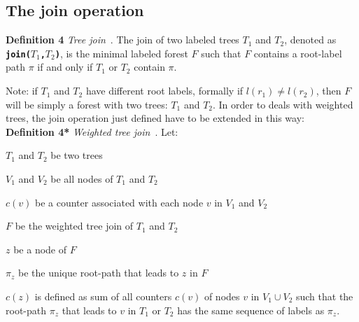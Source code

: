 \documentclass[a4paper,11pt]{report}
\begin{document}
\subsection{The join operation}

\textbf{Definition 4} \emph{Tree join}~\cite{kccf}. 
The join of two labeled trees $T_1$ and $T_2$, denoted as 
\texttt{\textbf{join(}}$T_1$\texttt{\textbf{,}}$T_2$\texttt{\textbf{)}}, 
is the minimal labeled forest $F$ such that $F$ contains a root-label path $\pi$ if and 
only if $T_1$ or $T_2$ contain $\pi$.

Note: if $T_1$ and $T_2$ have different root labels, 
formally if $l(r_1)\ne l(r_2)$, then $F$ will be simply a forest with two trees: $T_1$ and $T_2$. In order to deals with weighted trees, the join operation just defined have to be extended in this way: \\
\textbf{Definition 4*} \emph{Weighted tree join}~\cite{kccf}.
Let: 

\renewcommand{\labelitemi}{$-$}

\begin{itemize*}
\item $T_1$ and $T_2$ be two trees
\item $V_1$ and $V_2$ be all nodes of $T_1$ and $T_2$
\item $c(v)$ be a counter associated with each node $v$ in $V_1$ and $V_2$
\item $F$ be the weighted tree join of $T_1$ and $T_2$
\item $z$ be a node of $F$
\item $\pi_z$ be the unique root-path that leads to $z$ in $F$
\end{itemize*}
\renewcommand{\labelitemi}{$\bullet$}
$c(z)$ is defined as sum of all counters $c(v)$ of nodes $v$ in $V_1 \cup V_2$ such
that the root-path $\pi_z$ that leads to $v$ in $T_1$ or $T_2$ has the same sequence of 
labels as $\pi_z$.
\end{document}
